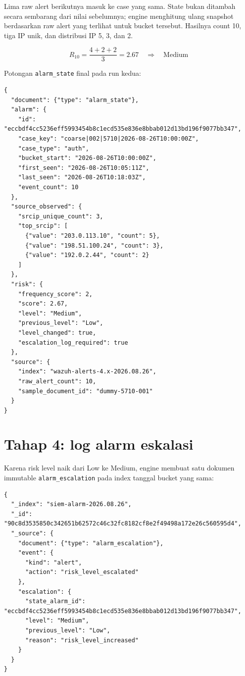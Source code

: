 \documentclass[11pt,a4paper,oneside]{report}
\DeclareRobustCommand{\code}[1]{\nolinkurl{#1}}
\begin{document}
Lima raw alert berikutnya masuk ke case yang sama. State bukan ditambah secara
sembarang dari nilai sebelumnya; engine menghitung ulang snapshot berdasarkan
raw alert yang terlihat untuk bucket tersebut. Hasilnya count 10, tiga IP unik,
dan distribusi IP 5, 3, dan 2.

\[
R_{10} = \frac{4+2+2}{3}=2.67 \quad\Longrightarrow\quad \text{Medium}
\]

Potongan \code{alarm_state} final pada run kedua:

\begin{lstlisting}
{
  "document": {"type": "alarm_state"},
  "alarm": {
    "id": "eccbdf4cc5236eff5993454b8c1ecd535e836e8bbab012d13bd196f9077bb347",
    "case_key": "coarse|002|5710|2026-08-26T10:00:00Z",
    "case_type": "auth",
    "bucket_start": "2026-08-26T10:00:00Z",
    "first_seen": "2026-08-26T10:05:11Z",
    "last_seen": "2026-08-26T10:18:03Z",
    "event_count": 10
  },
  "source_observed": {
    "srcip_unique_count": 3,
    "top_srcip": [
      {"value": "203.0.113.10", "count": 5},
      {"value": "198.51.100.24", "count": 3},
      {"value": "192.0.2.44", "count": 2}
    ]
  },
  "risk": {
    "frequency_score": 2,
    "score": 2.67,
    "level": "Medium",
    "previous_level": "Low",
    "level_changed": true,
    "escalation_log_required": true
  },
  "source": {
    "index": "wazuh-alerts-4.x-2026.08.26",
    "raw_alert_count": 10,
    "sample_document_id": "dummy-5710-001"
  }
}
\end{lstlisting}

\section{Tahap 4: log alarm eskalasi}

Karena risk level naik dari Low ke Medium, engine membuat satu dokumen immutable
\code{alarm_escalation} pada index tanggal bucket yang sama:

\begin{lstlisting}
{
  "_index": "siem-alarm-2026.08.26",
  "_id": "90c8d3535850c342651b62572c46c32fc8182cf8e2f49498a172e26c560595d4",
  "_source": {
    "document": {"type": "alarm_escalation"},
    "event": {
      "kind": "alert",
      "action": "risk_level_escalated"
    },
    "escalation": {
      "state_alarm_id": "eccbdf4cc5236eff5993454b8c1ecd535e836e8bbab012d13bd196f9077bb347",
      "level": "Medium",
      "previous_level": "Low",
      "reason": "risk_level_increased"
    }
  }
}
\end{lstlisting}
\end{document}
